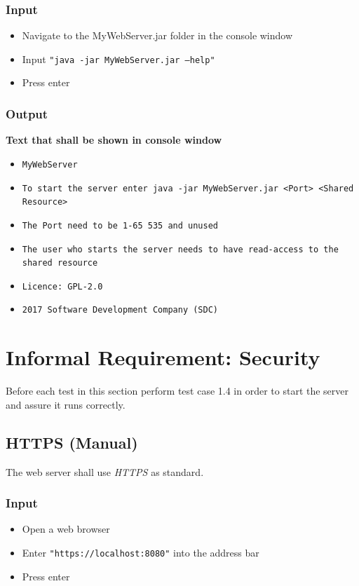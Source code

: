 \documentclass[a4paper, 12pt]{article}
\begin{document}
\subsubsection{Input}
\begin{itemize}
\item Navigate to the MyWebServer.jar folder in the console window
\item Input \texttt{"java -jar MyWebServer.jar --help"}
\item Press enter
\end{itemize} 

\subsubsection{Output}
\textbf{Text that shall be shown in console window}
\begin{itemize}
\item \texttt{MyWebServer}
\item \texttt{To start the server enter java -jar MyWebServer.jar <Port> <Shared Resource>}
\item \texttt{The Port need to be 1-65 535 and unused}
\item \texttt{The user who starts the server needs to have read-access to the shared resource}
\item \texttt{Licence: GPL-2.0}
\item \texttt{2017 Software Development Company (SDC)}
\end{itemize}

\newpage
\section{Informal Requirement: Security}

Before each test in this section perform test case 1.4 in order to start the server and assure it runs correctly.

\subsection{HTTPS (Manual)}

The web server shall use \textit{HTTPS} as standard.

\subsubsection{Input}
\begin{itemize}
\item Open a web browser
\item Enter \texttt{"https://localhost:8080"} into the address bar
\item Press enter
\end{itemize}
\end{document}
